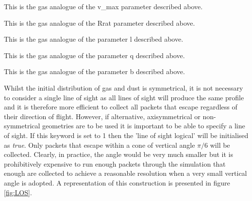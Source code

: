 
This is the gas analogue of the v\_max parameter described above.  


This is the gas analogue of the Rrat parameter described above.  


This is the gas analogue of the parameter l described above.  


This is the gas analogue of the parameter q described above.  


This is the gas analogue of the parameter b described above.  



 Whilst the initial distribution of gas and dust is symmetrical, it is not necessary to consider a single line of sight as all lines of sight will produce the same profile and it is therefore more efficient to collect all packets that escape regardless of their direction of flight.  However, if alternative, axisymmetrical or non-symmetrical geometries are to be used it is important to be able to specify a line of sight.  If this keyword is set to 1 then the 'line of sight logical' will be initialised as \textit{true}.  Only packets that escape within a cone of vertical angle $\pi/6$ will be collected.  Clearly, in practice, the angle would be very much smaller but it is prohibitively expensive to run enough packets through the simulation that enough are collected to achieve a reasonable resolution when a very small vertical angle is adopted.  A representation of this construction is presented in figure \ref{fig:LOS}.

